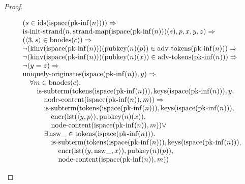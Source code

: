 \documentclass[11pt]{article}
\theoremstyle{plain}
\begin{document}
\begin{proof}
\begin{itemize}[leftmargin=2.8em, itemsep=4pt, parsep=1pt]
\begin{itemize}[leftmargin=2.8em, itemsep=4pt, parsep=1pt]
\begin{equation*}
\begin{array}{@{}l@{}}
\begin{array}{@{}l@{}} (s \in \operatorname{ids}(\operatorname{ispace}(\operatorname{pk\text{-}inf}(n)))) \Rightarrow  \\ \operatorname{is\text{-}init\text{-}strand}(n, \operatorname{strand\text{-}map}(\operatorname{ispace}(\operatorname{pk\text{-}inf}(n)))(s), p, x, y, z) \Rightarrow  \\ (\langle 3, s \rangle \in \operatorname{bnodes}(c)) \Rightarrow  \\ \neg (\operatorname{kinv}(\operatorname{ispace}(\operatorname{pk\text{-}inf}(n)))(\operatorname{pubkey}(n)(p)) \in \operatorname{adv\text{-}tokens}(\operatorname{pk\text{-}inf}(n))) \Rightarrow  \\ \neg (\operatorname{kinv}(\operatorname{ispace}(\operatorname{pk\text{-}inf}(n)))(\operatorname{pubkey}(n)(x)) \in \operatorname{adv\text{-}tokens}(\operatorname{pk\text{-}inf}(n))) \Rightarrow  \\ \neg (y = z) \Rightarrow  \\ \operatorname{uniquely\text{-}originates}(\operatorname{ispace}(\operatorname{pk\text{-}inf}(n)), y) \Rightarrow  \\ \quad \forall m \in \operatorname{bnodes}(c). \\ \quad \quad \operatorname{is\text{-}subterm}(\operatorname{tokens}(\operatorname{ispace}(\operatorname{pk\text{-}inf}(n))), \operatorname{keys}(\operatorname{ispace}(\operatorname{pk\text{-}inf}(n))), y, \\ \quad \quad \quad \operatorname{node\text{-}content}(\operatorname{ispace}(\operatorname{pk\text{-}inf}(n)), m)) \Rightarrow \\ \quad \quad \quad \operatorname{is\text{-}subterm}(\operatorname{tokens}(\operatorname{ispace}(\operatorname{pk\text{-}inf}(n))), \operatorname{keys}(\operatorname{ispace}(\operatorname{pk\text{-}inf}(n))), \\ \quad \quad \quad \quad \operatorname{encr}(\operatorname{lst}(\langle y, p \rangle), \operatorname{pubkey}(n)(x)), \\ \quad \quad \quad \quad \operatorname{node\text{-}content}(\operatorname{ispace}(\operatorname{pk\text{-}inf}(n)), m)) \vee \\ \quad \quad \quad \exists \operatorname{nsw\_} \in \operatorname{tokens}(\operatorname{ispace}(\operatorname{pk\text{-}inf}(n))). \\ \quad \quad \quad \quad \operatorname{is\text{-}subterm}(\operatorname{tokens}(\operatorname{ispace}(\operatorname{pk\text{-}inf}(n))), \operatorname{keys}(\operatorname{ispace}(\operatorname{pk\text{-}inf}(n))), \\ \quad \quad \quad \quad \quad \operatorname{encr}(\operatorname{lst}(\langle y, \operatorname{nsw\_}, x \rangle), \operatorname{pubkey}(n)(p)), \\ \quad \quad \quad \quad \quad \operatorname{node\text{-}content}(\operatorname{ispace}(\operatorname{pk\text{-}inf}(n)), m)) \end{array} \\

\end{array}
\end{equation*}
\end{itemize}
\end{itemize}
\end{proof}
\end{document}
